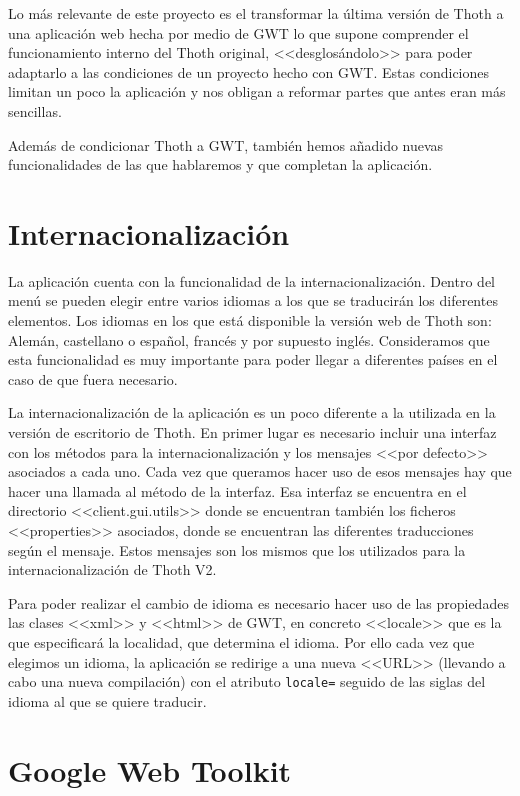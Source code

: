 
Lo más relevante de este proyecto es el transformar la última versión de Thoth a una aplicación web hecha por medio de GWT lo que supone comprender el funcionamiento interno del Thoth original, <<desglosándolo>> para poder adaptarlo a las condiciones de un proyecto hecho con GWT.
Estas condiciones limitan un poco la aplicación y nos obligan a reformar partes que antes eran más sencillas.

Además de condicionar Thoth a GWT, también hemos añadido nuevas funcionalidades de las que hablaremos y que completan la aplicación.



\section{Internacionalización}
La aplicación cuenta con la funcionalidad de la internacionalización. Dentro del menú se pueden elegir entre varios idiomas a los que se traducirán los diferentes elementos. Los idiomas en los que está disponible la versión web de Thoth son: Alemán, castellano o español, francés y por supuesto inglés. Consideramos que esta funcionalidad es muy importante para poder llegar a diferentes países en el caso de que fuera necesario.

La internacionalización de la aplicación es un poco diferente a la utilizada en la versión de escritorio de Thoth. En primer lugar es necesario incluir una interfaz con los métodos para la internacionalización y los mensajes <<por defecto>> asociados a cada uno. Cada vez que queramos hacer uso de esos mensajes hay que hacer una llamada al método de la interfaz. Esa interfaz se encuentra en el directorio <<client.gui.utils>> donde se encuentran también los ficheros <<properties>> asociados, donde se encuentran las diferentes traducciones según el mensaje. Estos mensajes son los mismos que los utilizados para la internacionalización de Thoth V2.

Para poder realizar el cambio de idioma es necesario hacer uso de las propiedades las clases <<xml>> y <<html>> de GWT, en concreto <<locale>> que es la que especificará la localidad, que determina el idioma. Por ello cada vez que elegimos un idioma, la aplicación se redirige a una nueva <<URL>> (llevando a cabo una nueva compilación) con el atributo \texttt{locale=} seguido de las siglas del idioma al que se quiere traducir.

\section{Google Web Toolkit}

